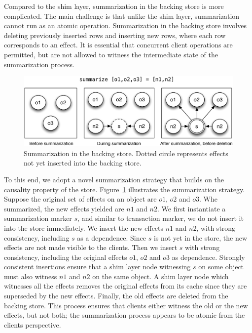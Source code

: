 Compared to the shim layer, summarization in the backing store is more
complicated. The main challenge is that unlike the shim layer, summarization
cannot run as an atomic operation. Summarization in the backing store involves
deleting previously inserted rows and inserting new rows, where each row
corresponds to an effect. It is essential that concurrent client operations are
permitted, but are not allowed to witness the intermediate state of the
summarization process.

\begin{figure}[t]
\begin{center}
\includegraphics[width=0.7\columnwidth]{Figures/SumDisk}
\end{center}
\caption{Summarization in the backing store. Dotted circle represents effects not yet inserted into the backing store.}
\label{fig:impl_sum_disk}
\end{figure}

To this end, we adopt a novel summarization strategy that builds on the
causality property of the store. Figure~\ref{fig:impl_sum_disk} illustrates the
summarization strategy. Suppose the original set of effects on an object are
$o1$, $o2$ and $o3$. Whe summarized, the new effects yielded are $n1$ and $n2$.
We first instantiate a summarization marker $s$, and similar to transaction
marker, we do not insert it into the store immediately. We insert the new
effects $n1$ and $n2$, with strong consistency, including $s$ as a dependence.
Since $s$ is not yet in the store, the new effects are not made visible to the
clients. Then we insert $s$ with strong consistency, including the original
effects $o1$, $o2$ and $o3$ as dependence. Strongly consistent insertions
ensure that a shim layer node witnessing $s$ on some object must also witness
$n1$ and $n2$ on the same object. A shim layer node which witnesses all the
effects removes the original effects from its cache since they are superseded
by the new effects. Finally, the old effects are deleted from the backing
store. This process ensures that clients either witness the old or the new
effects, but not both; the summarization process appears to be atomic from the
clients perspective.
